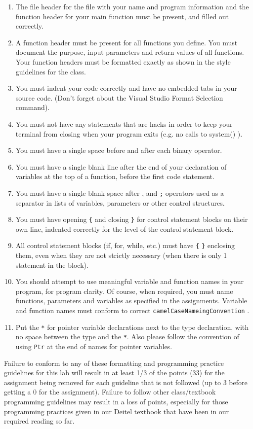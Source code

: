 \documentclass[11pt]{article}
\begin{document}
\begin{enumerate}
\item The file header for the file with your name and program information
  and the function header for your main function must be present, and
  filled out correctly.
\item A function header must be present for all functions you define.
   You must document the purpose, input parameters and return values
   of all functions.  Your function headers must be formatted exactly
   as shown in the style guidelines for the class.
\item You must indent your code correctly and have no embedded tabs in
  your source code. (Don't forget about the Visual Studio Format
  Selection command).
\item You must not have any statements that are hacks in order to keep
   your terminal from closing when your program exits (e.g. no calls
   to system() ).
\item You must have a single space before and after each binary operator.
\item You must have a single blank line after the end of your declaration
  of variables at the top of a function, before the first code
  statement.
\item You must have a single blank space after , and \verb~;~ operators used as a
  separator in lists of variables, parameters or other control
  structures.
\item You must have opening \verb~{~ and closing \verb~}~ for control statement blocks
  on their own line, indented correctly for the level of the control
  statement block.
\item All control statement blocks (if, for, while, etc.) must have \verb~{~
   \verb~}~ enclosing them, even when they are not strictly necessary
   (when there is only 1 statement in the block).
\item You should attempt to use meaningful variable and function names in
   your program, for program clarity.  Of course, when required, you
   must name functions, parameters and variables as specified in the
   assignments.  Variable and function names must conform to correct
   \verb~camelCaseNameingConvention~ .
\item Put the \verb~*~ for pointer variable declarations next to the
   type declaration, with no space between the type and the \verb~*~.
   Also please follow the convention of using \verb~Ptr~ at the end of
   names for pointer variables.
\end{enumerate}

Failure to conform to any of these formatting and programming practice
guidelines for this lab will result in at least 1/3 of the points (33)
for the assignment being removed for each guideline that is not
followed (up to 3 before getting a 0 for the assignment). Failure to
follow other class/textbook programming guidelines may result in a
loss of points, especially for those programming practices given in
our Deitel textbook that have been in our required reading so far.
\end{document}
